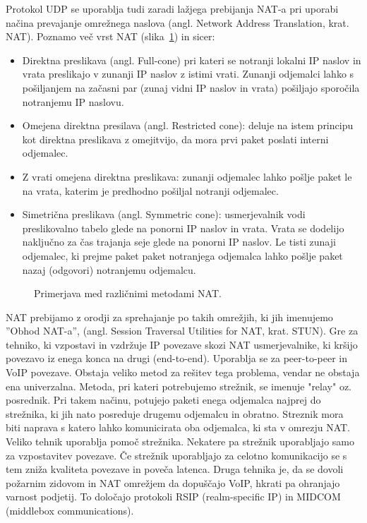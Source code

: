 \documentclass{acm_proc_article-sp}
\begin{document}
Protokol UDP se uporablja tudi zaradi lažjega prebijanja NAT-a pri uporabi načina prevajanje omrežnega naslova (angl. Network Address Translation, krat. NAT). Poznamo več vrst NAT (slika~\ref{fig:nat}) in sicer:
\begin{itemize}
  \item Direktna preslikava (angl. Full-cone) pri kateri se notranji lokalni IP naslov in vrata preslikajo v zunanji IP naslov z istimi vrati. Zunanji odjemalci lahko s pošiljanjem na začasni par (zunaj vidni IP naslov in vrata) pošiljajo sporočila notranjemu IP naslovu.
  \item Omejena direktna presilava (angl. Restricted cone): deluje na istem principu kot direktna preslikava z omejitvijo, da mora prvi paket poslati interni odjemalec.
  \item Z vrati omejena direktna preslikava: zunanji odjemalec lahko pošlje paket le na vrata, katerim je predhodno pošiljal notranji odjemalec.
  \item Simetrična preslikava (angl. Symmetric cone): usmerjevalnik vodi preslikovalno tabelo glede na ponorni IP naslov in vrata. Vrata se dodelijo naključno za čas trajanja seje glede na ponorni IP naslov. Le tisti zunaji odjemalec, ki prejme paket paket notranjega odjemalca lahko pošlje paket nazaj (odgovori) notranjemu odjemalcu.
\end{itemize}

\begin{figure}
\centering
{} %
\caption{Primerjava med različnimi metodami NAT.}
\label{fig:nat}
\end{figure}

NAT prebijamo z orodji za sprehajanje po takih omrežjih, ki jih imenujemo ''Obhod NAT-a'', (angl. Session Traversal Utilities for NAT, krat. STUN). Gre za tehniko, ki vzpostavi in vzdržuje IP povezave skozi NAT usmerjevalnike, ki kršijo povezavo iz enega konca na drugi (end-to-end). Uporablja se za peer-to-peer in VoIP povezave. Obstaja veliko metod za rešitev tega problema, vendar ne obstaja ena univerzalna. Metoda, pri kateri potrebujemo strežnik, se imenuje "relay" oz. posrednik. Pri takem načinu, potujejo paketi enega odjemalca najprej do strežnika, ki jih nato posreduje drugemu odjemalcu in obratno. Streznik mora biti naprava s katero lahko komunicirata oba odjemalca, ki sta v omrezju NAT. Veliko tehnik uporablja pomoč strežnika. Nekatere pa strežnik uporabljajo samo za vzpostavitev povezave. Če strežnik uporabljajo za celotno komunikacijo se s tem zniža kvaliteta povezave in poveča latenca. Druga tehnika je, da se dovoli požarnim zidovom in NAT omrežjem da dopuščajo VoIP, hkrati pa ohranjajo varnost podjetij. To določajo protokoli RSIP (realm-specific IP) in MIDCOM (middlebox communications).
\end{document}
